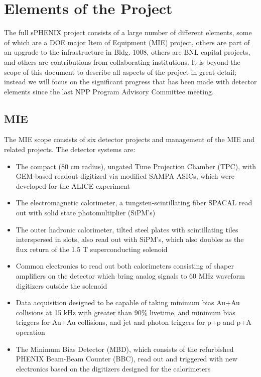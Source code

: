 \section{Elements of the Project}
\label{sec:elements}

The full sPHENIX project consists of a large number of different
elements, some of which are a DOE major Item of Equipment (MIE) project,
others are part of an
upgrade to the infrastructure in Bldg. 1008, others are BNL capital
projects, and others are contributions from collaborating
institutions.  It is beyond the scope of this document to describe all
aspects of the project in great detail; instead we will focus on
the significant progress that has been made with detector elements
since the last NPP Program Advisory Committee meeting.

\subsection{MIE}

The MIE scope consists of six detector projects and management of the
MIE and related projects.  The detector systems are:

\begin{itemize}
    \item The compact (80 cm radius), ungated Time Projection Chamber (TPC), with GEM-based readout digitized via modified SAMPA ASICs, which were developed for the ALICE experiment
    \item The electromagnetic calorimeter, a tungsten-scintillating fiber
    SPACAL read out with solid state photomultiplier (SiPM's)
    \item The outer hadronic calorimeter, tilted steel plates with scintillating tiles
    interspersed in slots, also read out with SiPM's, which also doubles
    as the flux return of the 1.5 T superconducting solenoid
    \item Common electronics to read out both calorimeters consisting of
    shaper amplifiers on the detector which bring analog signals to 60 MHz waveform digitizers outside the solenoid
    \item Data acquisition designed to be capable of taking minimum bias
    Au+Au collisions at 15 kHz with greater than 90\% livetime, and minimum bias triggers for Au+Au collisions, and jet and photon triggers for p+p and p+A operation
    \item The Minimum Bias Detector (MBD), which consists of the refurbished PHENIX Beam-Beam Counter (BBC), read out and triggered with new electronics based on the digitizers designed for the calorimeters
\end{itemize}

